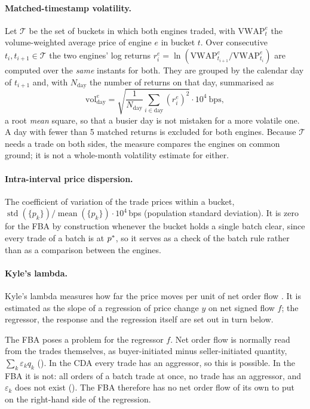 \paragraph{Matched-timestamp volatility.} Let $\mathcal{T}$ be the set
of buckets in which both engines traded, with $\mathrm{VWAP}^{e}_t$ the
volume-weighted average price of engine $e$ in bucket $t$. Over
consecutive $t_i, t_{i+1} \in \mathcal{T}$ the two engines' log returns
$r^{e}_i = \ln(\mathrm{VWAP}^{e}_{t_{i+1}} / \mathrm{VWAP}^{e}_{t_i})$ are
computed over the \emph{same} instants for both. They are grouped by the
calendar day of $t_{i+1}$ and, with $N_{\text{day}}$ the number of
returns on that day, summarised as
\begin{equation}
  \label{eq:matchedvol}
  \mathrm{vol}^{e}_{\text{day}} = \sqrt{\frac{1}{N_{\text{day}}}\sum_{i \in \text{day}} (r^{e}_i)^2}
  \cdot 10^{4}\ \text{bps},
\end{equation}
a root \emph{mean} square, so that a busier day is not mistaken for a more
volatile one. A day with fewer than 5 matched returns is excluded for both
engines. Because $\mathcal{T}$ needs a trade on both sides, the measure
compares the engines on common ground; it is not a whole-month volatility
estimate for either.

\paragraph{Intra-interval price dispersion.} The coefficient of
variation of the trade prices within a bucket,
$\operatorname{std}(\{p_k\}) / \operatorname{mean}(\{p_k\}) \cdot
10^{4}$\,bps (population standard deviation). It is zero for the FBA by
construction whenever the bucket holds a single batch clear, since every
trade of a batch is at $p^{\ast}$, so it serves as a check of the batch rule
rather than as a comparison between the engines.

\paragraph{Kyle's lambda.} Kyle's lambda measures how far the price
moves per unit of net order flow \citep{kyle1985continuous}. It is
estimated as the slope of a regression of price change $y$ on net signed
flow $f$; the regressor, the response and the regression itself are set
out in turn below.

The FBA poses a problem for the regressor $f$. Net order flow is normally
read from the trades themselves, as buyer-initiated minus
seller-initiated quantity, $\sum_k \varepsilon_k q_k$
(). In the CDA every trade has an aggressor, so
this is possible. In the FBA it is not: all orders of a batch trade at
once, no trade has an aggressor, and $\varepsilon_k$ does not exist
(). The FBA therefore has no net order flow of its
own to put on the right-hand side of the regression.

